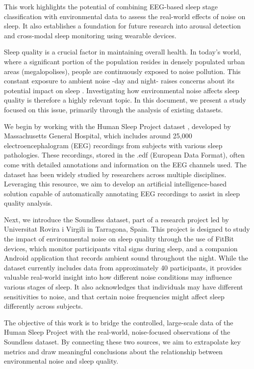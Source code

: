 This work highlights the potential of combining EEG-based sleep stage classification with environmental data to assess the real-world effects of noise on sleep. It also establishes a foundation for future research into arousal detection and cross-modal sleep monitoring using wearable devices.

Sleep quality is a crucial factor in maintaining overall health. In today's world, where a significant portion of the population resides in densely populated urban areas (megalopolises), people are continuously exposed to noise pollution. This constant exposure to ambient noise -day and night- raises concerns about its potential impact on sleep \cite{halperin, muzet, pirrera, riedel, witte}. Investigating how environmental noise affects sleep quality is therefore a highly relevant topic. In this document, we present a study focused on this issue, primarily through the analysis of existing datasets.

We begin by working with the Human Sleep Project dataset \cite{hsp}, developed by Massachusetts General Hospital, which includes around 25,000 electroencephalogram (EEG) recordings from subjects with various sleep pathologies. These recordings, stored in the .edf (European Data Format), often come with detailed annotations and information on the EEG channels used. The dataset has been widely studied by researchers across multiple disciplines. Leveraging this resource, we aim to develop an artificial intelligence-based solution capable of automatically annotating EEG recordings to assist in sleep quality analysis.

Next, we introduce the Soundless \cite{soundless} dataset, part of a research project led by Universitat Rovira i Virgili in Tarragona, Spain. This project is designed to study the impact of environmental noise on sleep quality through the use of FitBit devices, which monitor participants vital signs during sleep, and a companion Android application that records ambient sound throughout the night. While the dataset currently includes data from approximately 40 participants, it provides valuable real-world insight into how different noise conditions may influence various stages of sleep. It also acknowledges that individuals may have different sensitivities to noise, and that certain noise frequencies might affect sleep differently across subjects.

The objective of this work is to bridge the controlled, large-scale data of the Human Sleep Project with the real-world, noise-focused observations of the Soundless dataset. By connecting these two sources, we aim to extrapolate key metrics and draw meaningful conclusions about the relationship between environmental noise and sleep quality.

